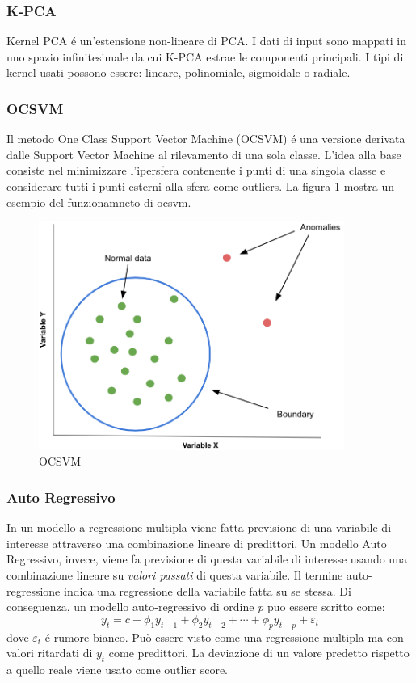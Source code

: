 \subsubsection{K-PCA}
Kernel PCA é un'estensione non-lineare di PCA. I dati di input sono mappati in uno spazio infinitesimale da cui K-PCA estrae le componenti principali. I tipi di kernel usati possono essere: lineare, polinomiale, sigmoidale o radiale.

\subsubsection{OCSVM}
Il metodo One Class Support Vector Machine (OCSVM) é una versione derivata dalle Support Vector Machine al rilevamento di una sola classe. L'idea alla base consiste nel minimizzare l'ipersfera contenente i punti di una singola classe e considerare tutti i punti esterni alla sfera come outliers.
La figura \ref{ocsvm} mostra un esempio del funzionamneto di ocsvm.
\begin{figure}[t]
	\centering
	\includegraphics[width=10cm, scale=1]{images/ocsvm}
	\caption{OCSVM}
	\label{ocsvm}
\end{figure}


\subsubsection{Auto Regressivo}
In un modello a regressione multipla viene fatta previsione di una variabile di interesse attraverso una combinazione lineare di predittori. Un modello Auto Regressivo, invece, viene fa previsione di questa variabile di interesse usando una combinazione lineare su \textit{valori passati} di questa variabile. Il termine auto-regressione indica una regressione della variabile fatta su se stessa.
Di conseguenza, un modello auto-regressivo di ordine \textit{p} puo essere scritto come:
\[y_t=c+\phi_1 y_{t-1}+\phi_2 y_{t-2}+\cdots+\phi_p y_{t-p}+\varepsilon_t\]
dove $\varepsilon_t$ é rumore bianco. Può essere visto come una regressione multipla ma con valori ritardati di $y_t$ come predittori. 
La deviazione di un valore predetto rispetto a quello reale viene usato come outlier score.

